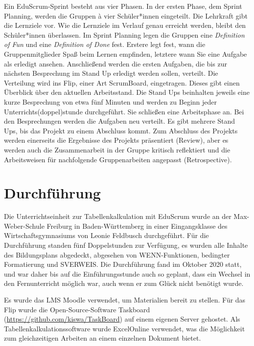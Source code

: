 \documentclass[twoside,twocolumn]{article}
\begin{document}
Ein EduScrum-Sprint besteht aus vier Phasen. In der ersten Phase, dem Sprint Planning, werden die Gruppen à vier Schüler*innen eingeteilt. Die Lehrkraft gibt die Lernziele vor. Wie die Lernziele im Verlauf genau erreicht werden, bleibt den Schüler*innen überlassen. Im Sprint Planning legen die Gruppen eine \textit{Definition of Fun} und eine \textit{Definition of Done} fest. Erstere legt fest, wann die Gruppenmitglieder Spaß beim Lernen empfinden, letztere wann Sie eine Aufgabe als erledigt ansehen. Anschließend werden die ersten Aufgaben, die bis zur nächsten Besprechung im Stand Up erledigt werden sollen, verteilt. Die Verteilung wird ins Flip, einer Art ScrumBoard, eingetragen. Dieses gibt einen Überblick über den aktuellen Arbeitsstand. Die Stand Ups beinhalten jeweils eine kurze Besprechung von etwa fünf Minuten und werden zu Beginn jeder Unterrichts(doppel)stunde durchgeführt. Sie schließen eine Arbeitsphase an. Bei den Besprechungen werden die Aufgaben neu verteilt. Es gibt mehrere Stand Ups, bis das Projekt zu einem Abschluss kommt. Zum Abschluss des Projekts werden einerseits die Ergebnisse des Projekts präsentiert (Review), aber es werden auch die Zusammenarbeit in der Gruppe kritisch reflektiert und die Arbeitsweisen für nachfolgende Gruppenarbeiten angepasst (Retrospective).


\section{Durchführung}

Die Unterrichtseinheit zur Tabellenkalkulation mit EduScrum wurde an der Max-Weber-Schule Freiburg in Baden-Württemberg in einer Eingangsklasse des Wirtschaftsgymnasiums von Leonie Feldbusch durchgeführt. Für die Durchführung standen fünf Doppelstunden zur Verfügung, es wurden alle Inhalte des Bildungsplans abgedeckt, abgesehen von WENN-Funktionen, bedingter Formatierung und SVERWEIS. Die Durchführung fand im Oktober 2020 statt, und war daher bis auf die Einführungsstunde auch so geplant, dass ein Wechsel in den Fernunterricht möglich war, auch wenn er zum Glück nicht benötigt wurde.

Es wurde das LMS Moodle verwendet, um Materialien bereit zu stellen. Für das Flip wurde die Open-Source-Software Taskboard (\url{https://github.com/kiswa/TaskBoard}) auf einem eigenen Server gehostet. Als Tabellenkalkulationssoftware wurde ExcelOnline verwendet, was die Möglichkeit zum gleichzeitigen Arbeiten an einem einzelnen Dokument bietet.
\end{document}
